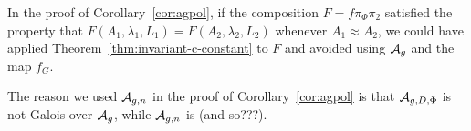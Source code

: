 \documentclass{amsart}
\begin{document}
\begin{remark}
In the proof of Corollary~\ref{cor:agpol}, if the composition $F=f\pi_\Phi\pi_2$  satisfied the property that $F(A_1,\lambda_1,L_1) = F(A_2,\lambda_2,L_2)$ whenever $A_1 \approx A_2$, we could have applied Theorem~\ref{thm:invariant-c-constant} to $F$  and avoided using $\mathcal{A}_g$ and the map $f_G$.
\end{remark}

\begin{remark}
The reason we used $\mathcal{A}_{g,n}$ in the proof of Corollary~\ref{cor:agpol} is that $\mathcal{A}_{g,{D},\Phi}$ is not Galois over $\mathcal{A}_g$, while $\mathcal{A}_{g,n}$ is (and so???).
\end{remark}





\end{document}
